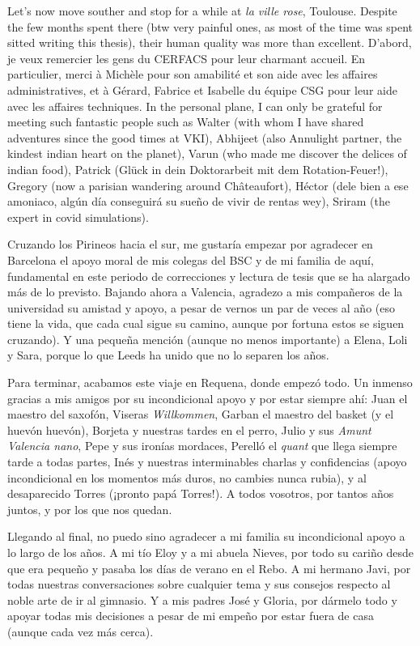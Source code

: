 Let's now move souther and stop for a while at \textsl{la ville rose}, Toulouse. Despite the few months spent there (btw very painful ones, as most of the time was spent sitted writing this thesis), their human quality was more than excellent. D'abord, je veux remercier les gens du CERFACS pour leur charmant accueil. En particulier, merci à Michèle pour son amabilité et son aide avec les affaires administratives, et à Gérard, Fabrice et Isabelle du équipe CSG pour leur aide avec les affaires techniques. In the personal plane, I can only be grateful for meeting such fantastic people such as Walter (with whom I have shared adventures since the good times at VKI), Abhijeet (also Annulight partner, the kindest indian heart on the planet), Varun (who made me discover the delices of indian food), Patrick (Glück in dein Doktorarbeit mit dem Rotation-Feuer!), Gregory (now a parisian wandering around Châteaufort), Héctor (dele bien a ese amoniaco, algún día conseguirá su sueño de vivir de rentas wey), Sriram (the expert in covid simulations).

Cruzando los Pirineos hacia el sur, me gustaría empezar por agradecer en Barcelona el apoyo moral de mis colegas del BSC y de mi familia de aquí, fundamental en este periodo de correcciones y lectura de tesis que se ha alargado más de lo previsto. Bajando ahora a Valencia, agradezo a mis compañeros de la universidad su amistad y apoyo, a pesar de vernos un par de veces al año (eso tiene la vida, que cada cual sigue su camino, aunque por fortuna estos se siguen cruzando). Y una pequeña mención (aunque no menos importante) a Elena, Loli y Sara, porque lo que Leeds ha unido que no lo separen los años. 

Para terminar, acabamos este viaje en Requena, donde empezó todo. Un inmenso gracias a mis amigos por su incondicional apoyo y por estar siempre ahí: Juan el maestro del saxofón, Viseras \textsl{Willkommen}, Garban el maestro del basket (y el huevón huevón), Borjeta y nuestras tardes en el perro, Julio y sus \textsl{Amunt Valencia nano}, Pepe y sus ironías mordaces, Perelló el \textsl{quant} que llega siempre tarde a todas partes, Inés y nuestras interminables charlas y confidencias (apoyo incondicional en los momentos más duros, no cambies nunca rubia), y al desaparecido Torres (¡pronto papá Torres!). A todos vosotros, por tantos años juntos, y por los que nos quedan.

Llegando al final, no puedo sino agradecer a mi familia su incondicional apoyo a lo largo de los años. A mi tío Eloy y a mi abuela Nieves, por todo su cariño desde que era pequeño y pasaba los días de verano en el Rebo. A mi hermano Javi, por todas nuestras conversaciones sobre cualquier tema y sus consejos respecto al noble arte de ir al gimnasio. Y a mis padres José y Gloria, por dármelo todo y apoyar todas mis decisiones a pesar de mi empeño por estar fuera de casa (aunque cada vez más cerca).

